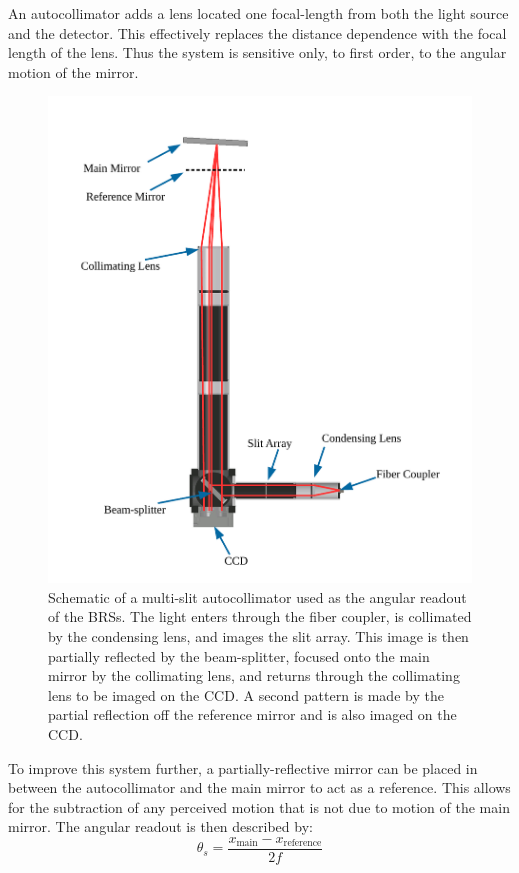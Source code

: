 \documentclass [12pt, proquest]{uwthesis}[2019]
\begin{document}
An autocollimator \cite{MSA} adds a lens located one focal-length from both the light source and the detector. This effectively replaces the distance dependence with the focal length of the lens. Thus the system is sensitive only, to first order, to the angular motion of the mirror.

\begin{figure}%
\begin{center}
 \includegraphics[width=\textwidth]{Autocollimator2.pdf}
\caption[Schematic of a multi-slit autocollimator]{Schematic of a multi-slit autocollimator used as the angular readout of the BRSs. The light enters through the fiber coupler, is collimated by the condensing lens, and images the slit array. This image is then partially reflected by the beam-splitter, focused onto the main mirror by the collimating lens, and returns through the collimating lens to be imaged on the CCD. A second pattern is made by the partial reflection off the reference mirror and is also imaged on the CCD.}
\label{ACFig}
\end{center}
\end{figure}

To improve this system further, a partially-reflective mirror can be placed in between the autocollimator and the main mirror to act as a reference. This allows for the subtraction of any perceived motion that is not due to motion of the main mirror. The angular readout is then described by:
\begin{equation}
\theta_{s}=\frac{x_{\text{main}}-x_{\text{reference}}}{2f}
\label{ACEq}
\end{equation}
\end{document}
